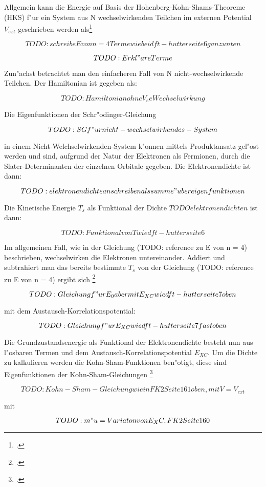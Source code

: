 Allgemein kann die Energie auf Basis der Hohenberg-Kohn-Shams-Theoreme (HKS) f"ur ein System aus N wechselwirkenden Teilchen im externen Potential $V_{ext} $ geschrieben werden als\footcite[6]{dft-hutter} 

$$TODO:schreibe E von n = 4 Terme wie bei dft-hutter seite 6 ganz unten$$

$$TODO:Erkl"are Terme$$


Zun"achst betrachtet man den einfacheren Fall von N nicht-wechselwirkende Teilchen. Der Hamiltonian ist gegeben als:

$$TODO: Hamiltonian ohne V_ee Wechselwirkung$$

Die Eigenfunktionen der Schr"odinger-Gleichung

$$TODO: SG f"ur nicht-wechselwirkendes-System$$

in einem Nicht-Welchselwirkenden-System k"onnen mittels Produktansatz gel"ost werden und sind, aufgrund der Natur der Elektronen als Fermionen, durch die Slater-Determinanten der einzelnen Orbitale gegeben. Die Elektronendichte ist dann:

$$TODO: elektronendichte anschreiben als summe "uber eigenfunktionen$$

Die Kinetische Energie $T_s$  als Funktional der Dichte $TODO elektronendichte n$ ist dann: 

$$TODO: Funktional von T wie dft-hutter seite 6$$

Im allgemeinen Fall, wie in der Gleichung (TODO: reference zu E von n = 4) beschrieben, wechselwirken die Elektronen untereinander. Addiert und subtrahiert man das bereits bestimmte $T_s$ von der Gleichung  (TODO: reference zu E von n = 4) ergibt sich \footcite[7]{dft-hutter}

$$TODO: Gleichung f"ur E_0 aber mit E_{XC} wie dft-hutter seite 7 oben$$

mit dem Austausch-Korrelationspotential: 

$$TODO: Gleichung f"ur E_{XC} wie dft-hutter seite 7 fast oben$$

Die Grundzustandsenergie als Funktional der Elektronendichte besteht nun aus l"osbaren Termen und dem Austausch-Korrelationspotential $E_{XC}$. Um die Dichte zu kalkulieren werden die Kohn-Sham-Funktionen ben"otigt,  diese sind Eigenfunktionen der Kohn-Sham-Gleichungen \footcite[161]{fk2}

$$TODO: Kohn-Sham-Gleichung wie in FK2 Seite 161 oben, mit V = V_{ext}$$

 
mit

$$TODO: m"u = Variaton von E_XC, FK2 Seite 160$$


